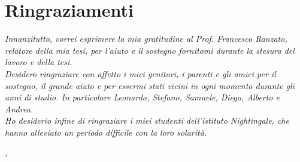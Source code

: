 
\cleardoublepage
{}
{}

\bigskip

\begingroup
\let\clearpage\relax
\let\cleardoublepage\relax
\let\cleardoublepage\relax

\chapter*{Ringraziamenti}

\noindent \textit{Innanzitutto, vorrei esprimere la mia gratitudine al Prof. Francesco Ranzato, relatore della mia tesi, per l'aiuto e il sostegno fornitomi durante la stesura del lavoro e della tesi.}\\

\noindent \textit{Desidero ringraziare con affetto i miei genitori, i parenti e gli amici per il sostegno, il grande aiuto e per essermi stati vicini in ogni momento durante gli anni di studio. In particolare
Leonardo, Stefano, Samuele, Diego, Alberto e Andrea.}\\

\noindent \textit{Ho desiderio infine di ringraziare i miei studenti dell'istituto Nightingale, che hanno alleviato un periodo difficile con la loro solarità.}\\
\bigskip

\noindent\textit{\myLocation, \myTime}
\hfill \myName

\endgroup

